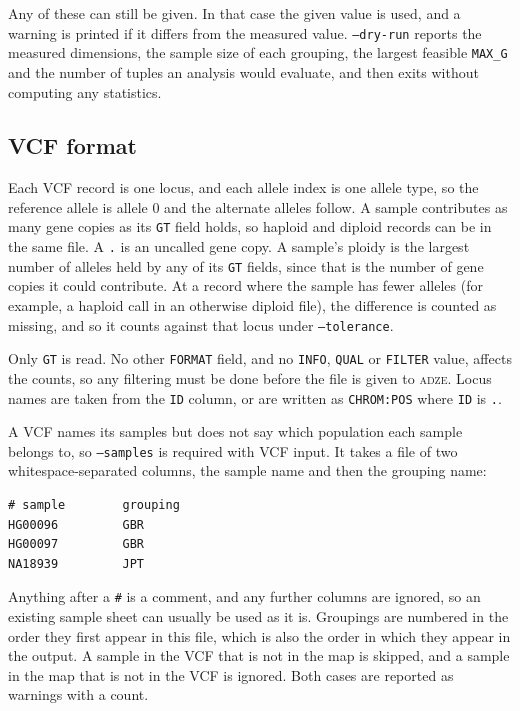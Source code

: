 \documentclass[11pt]{article}
\newcommand{\prog}{\textsc{adze}}
\newcommand{\flag}[1]{\texttt{#1}}
\begin{document}
Any of these can still be given. In that case the given value is used, and a
warning is printed if it differs from the measured value. \flag{--dry-run}
reports the measured dimensions, the sample size of each grouping, the largest
feasible \texttt{MAX\_G} and the number of tuples an analysis would evaluate,
and then exits without computing any statistics.

\subsection{VCF format}
\label{sec:vcf}

Each VCF record is one locus, and each allele index is one allele type, so
the reference allele is allele 0 and the alternate alleles follow. A sample
contributes as many gene copies as its \texttt{GT} field holds, so haploid and
diploid records can be in the same file. A \texttt{.} is an uncalled gene
copy. A sample's ploidy is the largest number of alleles held by any of its
\texttt{GT} fields, since that is the number of gene copies it could
contribute. At a record where the sample has fewer alleles (for example, a
haploid call in an otherwise diploid file), the difference is counted as
missing, and so it counts against that locus under \flag{--tolerance}.

Only \texttt{GT} is read. No other \texttt{FORMAT} field, and no
\texttt{INFO}, \texttt{QUAL} or \texttt{FILTER} value, affects the counts, so
any filtering must be done before the file is given to \prog. Locus names are
taken from the \texttt{ID} column, or are written as \texttt{CHROM:POS} where
\texttt{ID} is \texttt{.}.

A VCF names its samples but does not say which population each sample belongs
to, so \flag{--samples} is required with VCF input. It takes a file of two
whitespace-separated columns, the sample name and then the grouping name:

\begin{Verbatim}[xleftmargin=1em]
# sample        grouping
HG00096         GBR
HG00097         GBR
NA18939         JPT
\end{Verbatim}

\noindent Anything after a \texttt{\#} is a comment, and any further columns
are ignored, so an existing sample sheet can usually be used as it is.
Groupings are numbered in the order they first appear in this file, which is
also the order in which they appear in the output. A sample in the VCF that is
not in the map is skipped, and a sample in the map that is not in the VCF is
ignored. Both cases are reported as warnings with a count.
\end{document}
